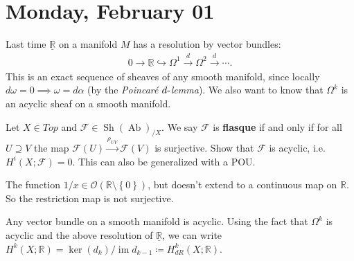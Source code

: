 \hypertarget{monday-february-01}{%
\section{Monday, February 01}\label{monday-february-01}}

\begin{remark}

Last time \(\underline{{\mathbb{R}}}\) on a manifold \(M\) has a
resolution by vector bundles:
\begin{align*}
0 \to \underline{{\mathbb{R}}} \hookrightarrow\Omega^1 \xrightarrow{d} \Omega^2 \xrightarrow{d} \cdots
.\end{align*}
This is an exact sequence of sheaves of any smooth manifold, since
locally \(d \omega = 0 \implies \omega = d \alpha\) (by the
\emph{Poincaré \(d {\hbox{-}}\)lemma}). We also want to know that
\(\Omega^k\) is an acyclic sheaf on a smooth manifold.

\end{remark}

\begin{exercise}[?]

Let \(X\in Top\) and
\(\mathcal{F}\in {\operatorname{Sh}}({\operatorname{Ab}})_{/X}\). We say
\(\mathcal{F}\) is \textbf{flasque} if and only if for all
\(U \supseteq V\) the map
\(\mathcal{F}(U) \xrightarrow{\rho_{UV}} \mathcal{F}(V)\) is surjective.
Show that \(\mathcal{F}\) is acyclic, i.e.~\(H^i(X; \mathcal{F}) = 0\).
This can also be generalized with a POU.

\end{exercise}

\begin{example}[?]

The function
\(1/x\in {\mathcal{O}}({\mathbb{R}}\setminus\left\{{0}\right\})\), but
doesn't extend to a continuous map on \({\mathbb{R}}\). So the
restriction map is not surjective.

\end{example}

\begin{remark}

Any vector bundle on a smooth manifold is acyclic. Using the fact that
\(\Omega^k\) is acyclic and the above resolution of
\(\underline{{\mathbb{R}}}\), we can write
\(H^k(X; {\mathbb{R}}) = \ker(d_k) / \operatorname{im}d_{k-1} \coloneqq H^k_{dR}(X; {\mathbb{R}})\).

\end{remark}


